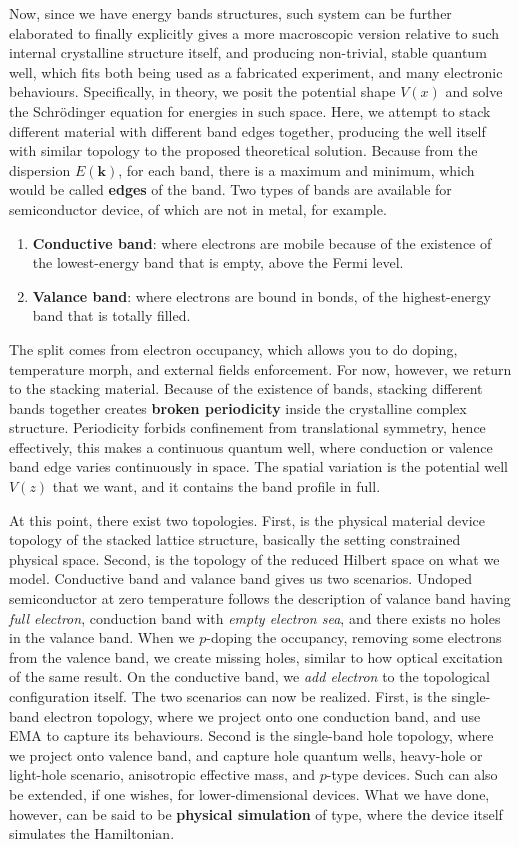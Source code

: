 Now, since we have energy bands structures, such system can be further elaborated to finally explicitly gives a more macroscopic version relative to such internal crystalline structure itself, and producing non-trivial, stable quantum well, which fits both being used as a fabricated experiment, and many electronic behaviours. Specifically, in theory, we posit the potential shape $V(x)$ and solve the Schrödinger equation for energies in such space. Here, we attempt to stack different material with different band edges together, producing the well itself with similar topology to the proposed theoretical solution. Because from the dispersion $E(\mathbf{k})$, for each band, there is a maximum and minimum, which would be called \textbf{edges} of the band. Two types of bands are available for semiconductor device, of which are not in metal, for example. 
\begin{enumerate}[itemsep=1pt,topsep=1pt]
    \item \textbf{Conductive band}: where electrons are mobile because of the existence of the lowest-energy band that is empty, above the Fermi level. 
    \item \textbf{Valance band}: where electrons are bound in bonds, of the highest-energy band that is totally filled. 
\end{enumerate}
The split comes from electron occupancy, which allows you to do doping, temperature morph, and external fields enforcement. For now, however, we return to the stacking material. Because of the existence of bands, stacking different bands together creates \textbf{broken periodicity} inside the crystalline complex structure. Periodicity forbids confinement from translational symmetry, hence effectively, this makes a continuous quantum well, where conduction or valence band edge varies continuously in space. The spatial variation is the potential well $V(z)$ that we want, and it contains the band profile in full. 

At this point, there exist two topologies. First, is the physical material device topology of the stacked lattice structure, basically the setting constrained physical space. Second, is the topology of the reduced Hilbert space on what we model. Conductive band and valance band gives us two scenarios. Undoped semiconductor at zero temperature follows the description of valance band having \textit{full electron}, conduction band with \textit{empty electron sea}, and there exists no holes in the valance band. When we $p$-doping the occupancy, removing some electrons from the valence band, we create missing holes, similar to how optical excitation of the same result. On the conductive band, we \textit{add electron} to the topological configuration itself. The two scenarios can now be realized. First, is the single-band electron topology, where we project onto one conduction band, and use EMA to capture its behaviours. Second is the single-band hole topology, where we project onto valence band, and capture hole quantum wells, heavy-hole or light-hole scenario, anisotropic effective mass, and $p$-type devices. Such can also be extended, if one wishes, for lower-dimensional devices. What we have done, however, can be said to be \textbf{physical simulation} of type, where the device itself simulates the Hamiltonian. 

